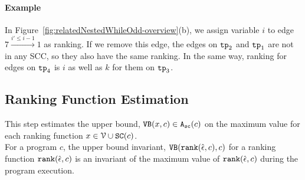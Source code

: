  

 \paragraph{Example}
 In Figure~\ref{fig:relatedNestedWhileOdd-overview}(b), we assign variable $i$ to edge $7 \xrightarrow{i' \leq i - 1} 1$ as ranking.
 If we remove this edge, the edges on $\mathtt{tp}_2$ and $\mathtt{tp}_1$ are not in any SCC, so they also have the same ranking.
In the same way, ranking for edges on $\mathtt{tp}_4$ is $i$ as well as $k$ for them on $\mathtt{tp}_3$.


 \subsection{Ranking Function Estimation}
 This step estimates the upper bound, ${\mathtt{VB}}(x, c) \in {\ensuremath{\mathtt{A_{sc}}}}(c)$
 on the maximum value for each ranking function $x \in \mathcal{V} \cup \mathtt{SC}(c)$.
 \\
 For a program $c$, the upper bound invariant,
 ${\mathtt{VB}}(\mathtt{rank}(\hat{\mathtt{\epsilon}{}}, c), c)$ for a ranking function $\mathtt{rank}(\hat{\mathtt{\epsilon}{}}, c)$ 
 is an invariant of the maximum value of $\mathtt{rank}(\hat{\mathtt{\epsilon}{}}, c)$ during the program execution.

